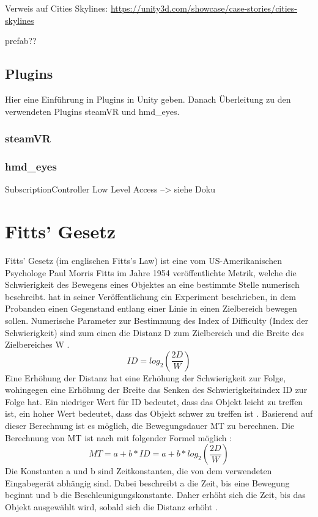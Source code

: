 Verweis auf Cities Skylines: \url{https://unity3d.com/showcase/case-stories/cities-skylines}

prefab??

\subsection{Plugins}
Hier eine Einführung in Plugins in Unity geben. Danach Überleitung zu den verwendeten Plugins steamVR und hmd\_eyes.

\subsubsection{steamVR}

\subsubsection{hmd\_eyes}
SubscriptionController Low Level Access --> siehe Doku


\section{Fitts' Gesetz}
\label{section:FittsLaw}
Fitts' Gesetz (im englischen Fitts's Law) ist eine vom US-Amerikanischen Psychologe Paul Morris Fitts im Jahre 1954 veröffentlichte Metrik, welche die Schwierigkeit des Bewegens eines Objektes an eine bestimmte Stelle numerisch beschreibt. \citeauthor{Fitts.1992} hat in seiner Veröffentlichung ein Experiment beschrieben, in dem Probanden einen Gegenstand entlang einer Linie in einen Zielbereich bewegen sollen. Numerische Parameter zur Bestimmung des \glqq Index of Difficulty\grqq{} (Index der Schwierigkeit) sind zum einen die Distanz D zum Zielbereich und die Breite des Zielbereiches W \cite{Fitts.1992}.
\begin{equation}
ID = log_2 \left ( \frac{2D}{W} \right )
\end{equation}
Eine Erhöhung der Distanz hat eine Erhöhung der Schwierigkeit zur Folge, wohingegen eine Erhöhung der Breite das Senken des Schwierigkeitsindex ID zur Folge hat. Ein niedriger Wert für ID bedeutet, dass das Objekt leicht zu treffen ist, ein hoher Wert bedeutet, dass das Objekt schwer zu treffen ist \cite{Fitts.1992}. 
Basierend auf dieser Berechnung ist es möglich, die Bewegungsdauer \ac{MT} zu berechnen. Die Berechnung von \ac{MT} ist nach \citeauthor{Graham.1996} mit folgender Formel möglich \cite{Graham.1996}:
\begin{equation}
MT = a + b * ID = a + b * log_2 \left ( \frac{2D}{W} \right )
\end{equation}
Die Konstanten a und b sind Zeitkonstanten, die von dem verwendeten Eingabegerät abhängig sind. Dabei beschreibt a die Zeit, bis eine Bewegung beginnt und b die Beschleunigungskonstante. Daher erhöht sich die Zeit, bis das Objekt ausgewählt wird, sobald sich die Distanz erhöht \cite{Graham.1996}.

